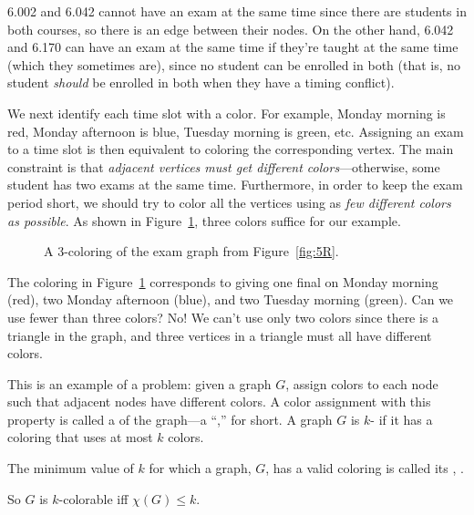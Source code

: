 6.002 and 6.042 cannot have an exam at the same time since there are
students in both courses, so there is an edge between their nodes.  On the
other hand, 6.042 and 6.170 can have an exam at the same time if they're
taught at the same time (which they sometimes are), since no student can
be enrolled in both (that is, no student \emph{should} be enrolled in both
when they have a timing conflict).

We next identify each time slot with a color.  For example, Monday
morning is red, Monday afternoon is blue, Tuesday morning is green,
etc.  Assigning an exam to a time slot is then equivalent to coloring
the corresponding vertex.  The main constraint is that \emph{adjacent
  vertices must get different colors}---otherwise, some student has
two exams at the same time.  Furthermore, in order to keep the exam
period short, we should try to color all the vertices using as
\emph{few different colors as possible}.  As shown in Figure~\ref{fig:5S},
three colors suffice for our example.

\begin{figure}


\caption{A 3-coloring of the exam graph from Figure~\ref{fig:5R}.}

\label{fig:5S}

\end{figure}

The coloring in Figure~\ref{fig:5S} corresponds to giving one final on
Monday morning (red), two Monday afternoon (blue), and two Tuesday
morning (green).  Can we use fewer than three colors?  No! We can't
use only two colors since there is a triangle in the graph, and three
vertices in a triangle must all have different colors.

This is an example of a  problem:
 given a graph $G$, assign colors to each
node such that adjacent nodes have different colors.  A color assignment
with this property is called a   of the graph---a ``,'' for short.  A graph $G$
is $k$- if it has a coloring that uses at most $k$ colors.
\begin{definition}
  The minimum value of $k$ for which a graph, $G$, has a valid coloring is
  called its , .
\end{definition}
So $G$ is $k$-colorable iff $\chi(G) \leq k$.

